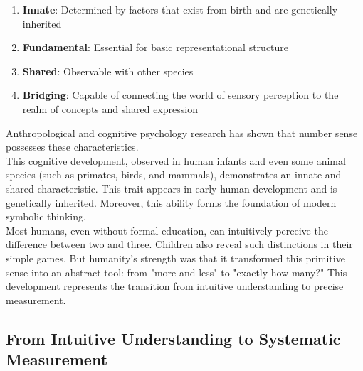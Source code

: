 \begin{enumerate}
	\item \textbf{Innate}: Determined by factors that exist from birth and are genetically inherited
	\item \textbf{Fundamental}: Essential for basic representational structure
	\item \textbf{Shared}: Observable with other species
	\item \textbf{Bridging}: Capable of connecting the world of sensory perception to the realm of concepts and shared expression
\end{enumerate}
Anthropological and cognitive psychology research has shown that number sense possesses these characteristics.\\
This cognitive development, observed in human infants and even some animal species (such as primates, birds, and mammals), demonstrates an innate and shared characteristic. This trait appears in early human development and is genetically inherited. Moreover, this ability forms the foundation of modern symbolic thinking.\\
Most humans, even without formal education, can intuitively perceive the difference between two and three. Children also reveal such distinctions in their simple games. But humanity's strength was that it transformed this primitive sense into an abstract tool: from "more and less" to "exactly how many?" This development represents the transition from intuitive understanding to precise measurement.

\subsection{From Intuitive Understanding to Systematic Measurement}

